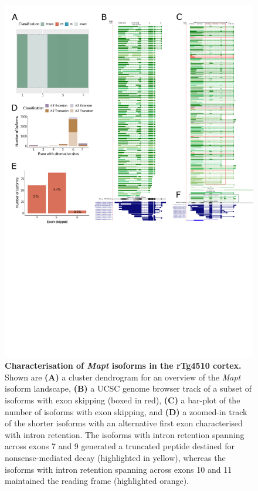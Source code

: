 \begin{figure}[htp]
	\centering
	\includegraphics[page=5,trim={0 10cm 0 0},scale = 0.85]{Figures/TargetGenes_Annotation_Portrait.pdf}
	\captionsetup{width=0.95\textwidth}
	\caption[Characterisation of \textit{Mapt} isoforms in the rTg4510 cortex]%
	{\textbf{Characterisation of \textit{Mapt} isoforms in the rTg4510 cortex.} Shown are \textbf{(A)} a cluster dendrogram for an overview of the \textit{Mapt} isoform landscape, \textbf{(B)} a UCSC genome browser track of a subset of isoforms with exon skipping (boxed in red), \textbf{(C)} a bar-plot of the number of isoforms with exon skipping, and \textbf{(D)} a zoomed-in track of the shorter isoforms with an alternative first exon characterised with intron retention. The isoforms with intron retention spanning across exons 7 and 9 generated a truncated peptide destined for nonsense-mediated decay (highlighted in yellow), whereas the isoforms with intron retention spanning across exons 10 and 11 maintained the reading frame (highlighted orange).}    
	\label{fig:mapt}
\end{figure}
\restoregeometry

